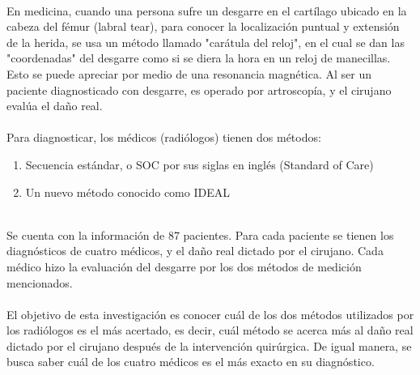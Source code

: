 \documentclass{article}
\begin{document}
	\ \\ 
	En medicina, cuando una persona sufre un desgarre en el cartílago ubicado en la cabeza del fémur (labral tear), para conocer la localización puntual y extensión de la herida, se usa un método llamado "carátula del reloj", en el cual se dan las "coordenadas" del desgarre como si se diera la hora en un reloj de manecillas. Esto se puede apreciar por medio de una resonancia magnética. Al ser un paciente diagnosticado con desgarre, es operado por artroscopía, y el cirujano evalúa el daño real. 
	\ \\ \ \\
	Para diagnosticar, los médicos (radiólogos) tienen dos métodos: 
	\begin{enumerate}
		\item Secuencia estándar, o SOC por sus siglas en inglés (Standard of Care)
		\item Un nuevo método conocido como IDEAL %
	\end{enumerate}	
	\ \\ 
	 
	 Se cuenta con la información de 87 pacientes. Para cada paciente se tienen los diagnósticos de cuatro médicos, y el daño real dictado por el cirujano. Cada médico hizo la evaluación del desgarre por los dos métodos de medición mencionados.
	 \ \\ \ \\
	 El objetivo de esta investigación es conocer cuál de los dos métodos utilizados por los radiólogos es el más acertado, es decir, cuál método se acerca más al daño real dictado por el cirujano después de la intervención quirúrgica. De igual manera, se busca saber cuál de los cuatro médicos es el más exacto en su diagnóstico.
	 \ \\ \ \\
	 
\end{document}
